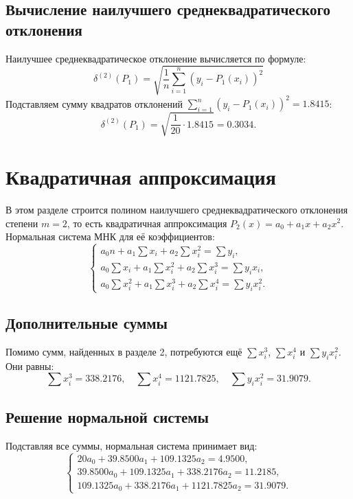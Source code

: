 \subsection{Вычисление наилучшего среднеквадратического отклонения}
Наилучшее среднеквадратическое отклонение вычисляется по формуле:
\[
\delta^{(2)}(P_1) = \sqrt{\frac{1}{n} \sum_{i=1}^{n} (y_i - P_1(x_i))^2}
\]
Подставляем сумму квадратов отклонений $\sum_{i=1}^{n} (y_i - P_1(x_i))^2 = 1.8415$:
\[
\delta^{(2)}(P_1) = \sqrt{\frac{1}{20} \cdot 1.8415} = 0.3034.
\]

\section{Квадратичная аппроксимация}
В этом разделе строится полином наилучшего среднеквадратического отклонения степени $m = 2$, то есть квадратичная аппроксимация $P_2(x) = a_0 + a_1x + a_2x^2$.
Нормальная система МНК для её коэффициентов:
\[
\left\{
\begin{array}{l}
a_0 n + a_1 \sum x_i + a_2 \sum x_i^2 = \sum y_i, \\
a_0 \sum x_i + a_1 \sum x_i^2 + a_2 \sum x_i^3 = \sum y_i x_i, \\
a_0 \sum x_i^2 + a_1 \sum x_i^3 + a_2 \sum x_i^4 = \sum y_i x_i^2.
\end{array}
\right.
\]

\subsection{Дополнительные суммы}
Помимо сумм, найденных в разделе 2, потребуются ещё $\sum x_i^3$, $\sum x_i^4$ и $\sum y_i x_i^2$. Они равны:
\[
\sum x_i^3 = 338.2176, \quad \sum x_i^4 = 1121.7825, \quad \sum y_i x_i^2 = 31.9079.
\]

\subsection{Решение нормальной системы}
Подставляя все суммы, нормальная система принимает вид:
\[
\left\{
\begin{array}{l}
20 a_0 + 39.8500 a_1 + 109.1325 a_2 = 4.9500, \\
39.8500 a_0 + 109.1325 a_1 + 338.2176 a_2 = 11.2185, \\
109.1325 a_0 + 338.2176 a_1 + 1121.7825 a_2 = 31.9079.
\end{array}
\right.
\]


